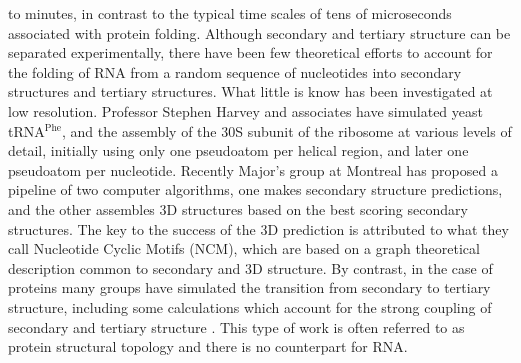 to minutes, in contrast to the typical time scales of tens of
microseconds associated with protein folding.
Although secondary and tertiary structure can be separated
experimentally, there have been few theoretical efforts to account
for the folding of RNA from a random sequence of nucleotides into
secondary structures and tertiary structures. What little is know
has been investigated at low resolution. Professor Stephen Harvey
and associates have simulated yeast tRNA$^{\textrm{Phe}}$, \cite{malhotra1990} 
and the assembly of the 30S subunit of the ribosome \cite{stagg2003}
 at various levels of detail, initially using
only one pseudoatom per helical region, and later one pseudoatom per
nucleotide. Recently Major's group \cite{parisien2008} at Montreal has 
proposed a pipeline of two computer algorithms, one makes secondary 
structure predictions, and the other assembles 3D structures based
on the best scoring secondary structures. The key to the success of 
the 3D prediction is attributed to what they call Nucleotide Cyclic 
Motifs (NCM), which are based on a graph theoretical description 
common to secondary and 3D structure.
By contrast, in the case of proteins many groups have simulated the
transition from secondary to tertiary structure, including some
calculations which account for the strong coupling of secondary and
tertiary structure \cite{westhead1999, gerstein2003, meiler2003}.
This type of work is often referred to as protein structural
topology and there is no counterpart for RNA.


